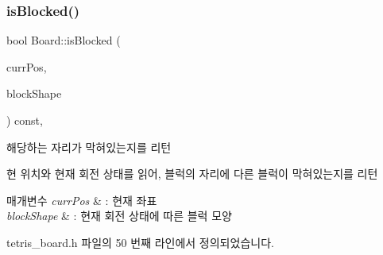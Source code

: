 \subsubsection{\texorpdfstring{is\+Blocked()}{isBlocked()}\hspace{0.1cm}{\footnotesize\ttfamily [2/2]}}
{\footnotesize\ttfamily bool Board\+::is\+Blocked (\begin{DoxyParamCaption}\item[{const \mbox{\hyperlink{struct_coord}{Coord}} \&}]{curr\+Pos,  }\item[{const \mbox{\hyperlink{class_block_aca5d951639f113e2ebd7856209d6b9ab}{Block\+::\+Block\+Shape}} \&}]{block\+Shape }\end{DoxyParamCaption}) const\hspace{0.3cm}{\ttfamily [inline]}, {\ttfamily [private]}}



해당하는 자리가 막혀있는지를 리턴 

현 위치와 현재 회전 상태를 읽어, 블럭의 자리에 다른 블럭이 막혀있는지를 리턴 
\begin{DoxyParams}{매개변수}
{\em curr\+Pos} & \+: 현재 좌표 \\
\hline
{\em block\+Shape} & \+: 현재 회전 상태에 따른 블럭 모양 \\
\hline
\end{DoxyParams}


tetris\+\_\+board.\+h 파일의 50 번째 라인에서 정의되었습니다.


